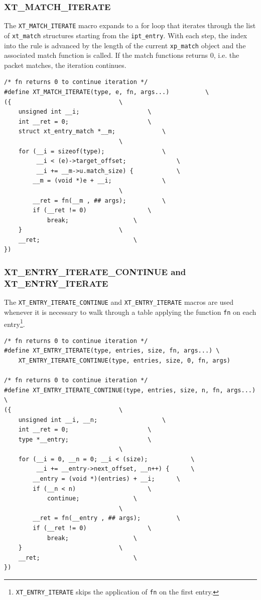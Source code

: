 \documentclass[a4paper,10pt]{article}
\newcommand{\code}[1]{\texttt{{#1}}}
\begin{document}
\subsubsection{XT\_MATCH\_ITERATE}

The \code{XT\_MATCH\_ITERATE} macro expands to a for loop that
iterates through the list of \code{xt\_match} structures starting from
the \code{ipt\_entry}. With each step, the index into the rule is
advanced by the length of the current \code{xp\_match} object and the
associated match function is called. If the match functions returns 0,
i.e. the packet matches, the iteration continues.


\begin{lstlisting}
/* fn returns 0 to continue iteration */
#define XT_MATCH_ITERATE(type, e, fn, args...)			\
({								\
	unsigned int __i;					\
	int __ret = 0;						\
	struct xt_entry_match *__m;				\
								\
	for (__i = sizeof(type);				\
	     __i < (e)->target_offset;				\
	     __i += __m->u.match_size) {			\
		__m = (void *)e + __i;				\
								\
		__ret = fn(__m , ## args);			\
		if (__ret != 0)					\
			break;					\
	}							\
	__ret;							\
})

\end{lstlisting}


\subsubsection{XT\_ENTRY\_ITERATE\_CONTINUE and XT\_ENTRY\_ITERATE}

The \code{XT\_ENTRY\_ITERATE\_CONTINUE} and \code{XT\_ENTRY\_ITERATE}
macros are used whenever it is necessary to walk through a table
applying the function \code{fn} on each
entry\footnote{\code{XT\_ENTRY\_ITERATE} skips the application of
  \code{fn} on the first entry.}.

\begin{lstlisting}
/* fn returns 0 to continue iteration */
#define XT_ENTRY_ITERATE(type, entries, size, fn, args...) \
	XT_ENTRY_ITERATE_CONTINUE(type, entries, size, 0, fn, args)

/* fn returns 0 to continue iteration */
#define XT_ENTRY_ITERATE_CONTINUE(type, entries, size, n, fn, args...) \
({								\
	unsigned int __i, __n;					\
	int __ret = 0;						\
	type *__entry;						\
								\
	for (__i = 0, __n = 0; __i < (size);			\
	     __i += __entry->next_offset, __n++) { 		\
		__entry = (void *)(entries) + __i;		\
		if (__n < n)					\
			continue;				\
								\
		__ret = fn(__entry , ## args);			\
		if (__ret != 0)					\
			break;					\
	}							\
	__ret;							\
})
\end{lstlisting}
\end{document}
